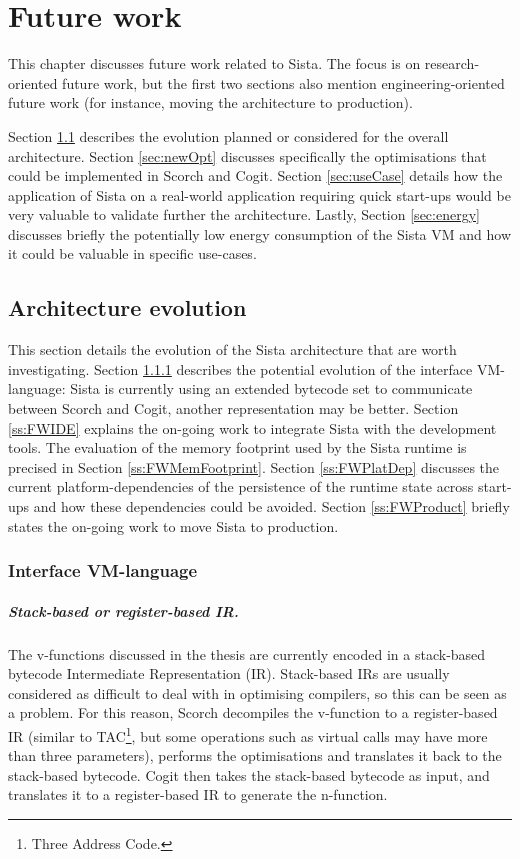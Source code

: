 \documentclass[a4paper,12pt,twoside]{../includes/ThesisStyle}
\begin{document}
\fi

\chapter{Future work}
\label{chap:futureWork}
\minitoc

This chapter discusses future work related to Sista. The focus is on research-oriented future work, but the first two sections also mention engineering-oriented future work (for instance, moving the architecture to production).

Section \ref{sec:archEvo} describes the evolution planned or considered for the overall architecture. Section \ref{sec:newOpt} discusses specifically the optimisations that could be implemented in Scorch and Cogit. Section \ref{sec:useCase} details how the application of Sista on a real-world application requiring quick start-ups would be very valuable to validate further the architecture. Lastly, Section \ref{sec:energy} discusses briefly the potentially low energy consumption of the Sista VM and how it could be valuable in specific use-cases.

\section{Architecture evolution}
\label{sec:archEvo}

This section details the evolution of the Sista architecture that are worth investigating. Section \ref{ss:FWInterface} describes the potential evolution of the interface VM-language: Sista is currently using an extended bytecode set to communicate between Scorch and Cogit, another representation may be better. Section \ref{ss:FWIDE} explains the on-going work to integrate Sista with the development tools. The evaluation of the memory footprint used by the Sista runtime is precised in Section \ref{ss:FWMemFootprint}. Section \ref{ss:FWPlatDep} discusses the current platform-dependencies of the persistence of the runtime state across start-ups and how these dependencies could be avoided. Section \ref{ss:FWProduct} briefly states the on-going work to move Sista to production.

\subsection{Interface VM-language}
\label{ss:FWInterface}

\paragraph{Stack-based or register-based IR.}The v-functions discussed in the thesis are currently encoded in a stack-based bytecode Intermediate Representation (IR). Stack-based IRs are usually considered as difficult to deal with in optimising compilers, so this can be seen as a problem. For this reason, Scorch decompiles the v-function to a register-based IR (similar to TAC\footnote{Three Address Code.}, but some operations such as virtual calls may have more than three parameters), performs the optimisations and translates it back to the stack-based bytecode. Cogit then takes the stack-based bytecode as input, and translates it to a register-based IR to generate the n-function. 
\end{document}
